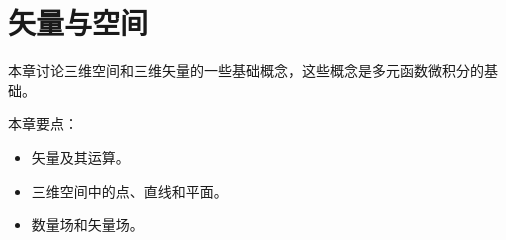 \chapter{矢量与空间}

本章讨论三维空间和三维矢量的一些基础概念，这些概念是多元函数微积分的基础。

本章要点：
\begin{itemize}
    \item 矢量及其运算。
    \item 三维空间中的点、直线和平面。
    \item 数量场和矢量场。
\end{itemize}

~

\newpage


\newpage


\newpage


\newpage





